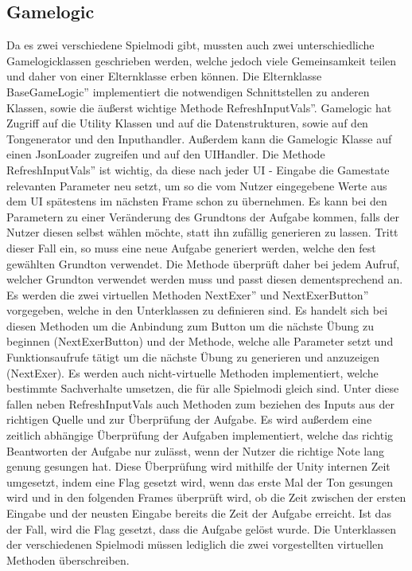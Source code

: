 \subsection*{Gamelogic}
Da es zwei verschiedene Spielmodi gibt, mussten auch zwei unterschiedliche Gamelogicklassen geschrieben werden, welche jedoch viele Gemeinsamkeit teilen und daher von einer Elternklasse erben können. Die Elternklasse \glqq BaseGameLogic'' implementiert die notwendigen Schnittstellen zu anderen Klassen, sowie die äußerst wichtige Methode \glqq RefreshInputVals''. Gamelogic hat Zugriff auf die Utility Klassen und auf die Datenstrukturen, sowie auf den Tongenerator und den Inputhandler. Außerdem kann die Gamelogic Klasse auf einen JsonLoader zugreifen und auf den UIHandler. Die Methode \glqq RefreshInputVals'' ist wichtig, da diese nach jeder UI - Eingabe die Gamestate relevanten Parameter neu setzt, um so die vom Nutzer eingegebene Werte aus dem UI spätestens im nächsten Frame schon zu übernehmen. Es kann bei den Parametern zu einer Veränderung des Grundtons der Aufgabe kommen, falls der Nutzer diesen selbst wählen möchte, statt ihn zufällig generieren zu lassen. Tritt dieser Fall ein, so muss eine neue Aufgabe generiert werden, welche den fest gewählten Grundton verwendet. Die Methode überprüft daher bei jedem Aufruf, welcher Grundton verwendet werden muss und passt diesen dementsprechend an. Es werden die zwei virtuellen Methoden \glqq NextExer'' und \glqq NextExerButton'' vorgegeben, welche in den Unterklassen zu definieren sind. Es handelt sich bei diesen Methoden um die Anbindung zum Button um die nächste Übung zu beginnen (NextExerButton) und der Methode, welche alle Parameter setzt und Funktionsaufrufe tätigt um die nächste Übung zu generieren und anzuzeigen (NextExer). Es werden auch nicht-virtuelle Methoden implementiert, welche bestimmte Sachverhalte umsetzen, die für alle Spielmodi gleich sind. Unter diese fallen neben RefreshInputVals auch Methoden zum beziehen des Inputs aus der richtigen Quelle und zur Überprüfung der Aufgabe. Es wird außerdem eine zeitlich abhängige Überprüfung der Aufgaben implementiert, welche das richtig Beantworten der Aufgabe nur zulässt, wenn der Nutzer die richtige Note lang genung gesungen hat. Diese Überprüfung wird mithilfe der Unity internen Zeit umgesetzt, indem eine Flag gesetzt wird, wenn das erste Mal der Ton gesungen wird und in den folgenden Frames überprüft wird, ob die Zeit zwischen der ersten Eingabe und der neusten Eingabe bereits die Zeit der Aufgabe erreicht. Ist das der Fall, wird die Flag gesetzt, dass die Aufgabe gelöst wurde. Die Unterklassen der verschiedenen Spielmodi müssen lediglich die zwei vorgestellten virtuellen Methoden überschreiben.\\
